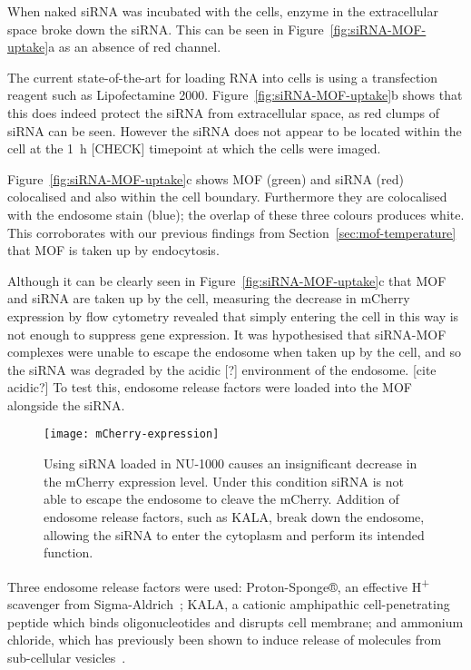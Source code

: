 When naked siRNA was incubated with the cells, enzyme in the extracellular space broke down the siRNA. 
This can be seen in Figure~\ref{fig:siRNA-MOF-uptake}a as an absence of red channel. 

The current state-of-the-art for loading RNA into cells is using a transfection reagent such as Lipofectamine 2000. 
Figure~\ref{fig:siRNA-MOF-uptake}b shows that this does indeed protect the siRNA from extracellular space, as red clumps of siRNA can be seen. 
However the siRNA does not appear to be located within the cell at the \SI{1}{\hour} [CHECK] timepoint at which the cells were imaged. 

Figure~\ref{fig:siRNA-MOF-uptake}c shows MOF (green) and siRNA (red) colocalised and also within the cell boundary. 
Furthermore they are colocalised with the endosome stain (blue); the overlap of these three colours produces white. 
This corroborates with our previous findings from Section~\ref{sec:mof-temperature} that MOF is taken up by endocytosis. 

Although it can be clearly seen in Figure~\ref{fig:siRNA-MOF-uptake}c that MOF and siRNA are taken up by the cell, measuring the decrease in mCherry expression by flow cytometry revealed that simply entering the cell in this way is not enough to suppress gene expression. 
It was hypothesised that siRNA-MOF complexes were unable to escape the endosome when taken up by the cell, and so the siRNA was degraded by the acidic [?] environment of the endosome. [cite acidic?]
To test this, endosome release factors were loaded into the MOF alongside the siRNA. 

\begin{figure}[htbp!]
\centering
\texttt{[image: mCherry-expression]} %
\caption[MOFs: siRNA suppresses mCherry expression when an endosome release factor is loaded to MOFs]{ Using siRNA loaded in NU-1000 causes an insignificant decrease in the mCherry expression level. Under this condition siRNA is not able to escape the endosome to cleave the mCherry. Addition of endosome release factors, such as KALA, break down the endosome, allowing the siRNA to enter the cytoplasm and perform its intended function. }
\label{fig:mCherry-expression}
\end{figure}

Three endosome release factors were used: Proton-Sponge®, an effective H\textsuperscript{+} scavenger from Sigma-Aldrich~\cite{ozkar2002nanocluster}; KALA, a cationic amphipathic cell-penetrating peptide which binds oligonucleotides and disrupts cell membrane; and ammonium chloride, which has previously been shown to induce release of molecules from sub-cellular vesicles~\cite{cervia2017distinct}. 

